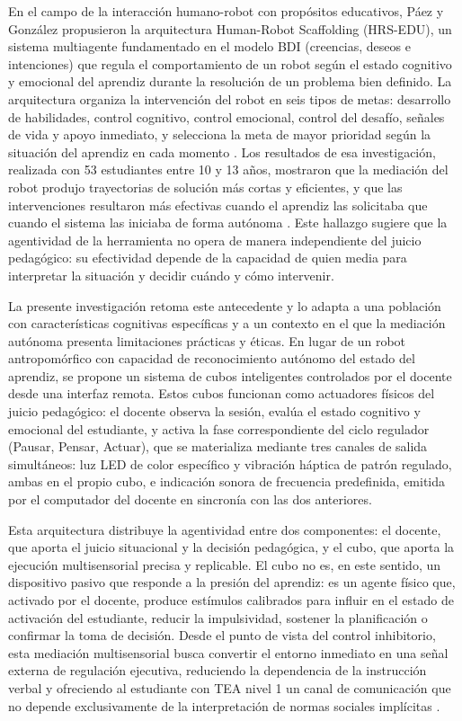 \documentclass{book}
\begin{document}
En el campo de la interacción humano-robot con propósitos 
educativos, Páez y González propusieron la arquitectura 
Human-Robot Scaffolding (HRS-EDU), un sistema multiagente 
fundamentado en el modelo BDI (creencias, deseos e intenciones) 
que regula el comportamiento de un robot según el estado 
cognitivo y emocional del aprendiz durante la resolución de un 
problema bien definido. La arquitectura organiza la intervención 
del robot en seis tipos de metas: desarrollo de habilidades, 
control cognitivo, control emocional, control del desafío, 
señales de vida y apoyo inmediato, y selecciona la meta de mayor 
prioridad según la situación del aprendiz en cada momento 
\cite{PaezGonzalez2022}. Los resultados de esa investigación, 
realizada con 53 estudiantes entre 10 y 13 años, mostraron que 
la mediación del robot produjo trayectorias de solución más 
cortas y eficientes, y que las intervenciones resultaron más 
efectivas cuando el aprendiz las solicitaba que cuando el sistema 
las iniciaba de forma autónoma \cite{PaezGonzalez2022}. Este 
hallazgo sugiere que la agentividad de la herramienta no opera 
de manera independiente del juicio pedagógico: su efectividad 
depende de la capacidad de quien media para interpretar la 
situación y decidir cuándo y cómo intervenir.

La presente investigación retoma este antecedente y lo adapta 
a una población con características cognitivas específicas y a 
un contexto en el que la mediación autónoma presenta limitaciones 
prácticas y éticas. En lugar de un robot antropomórfico con 
capacidad de reconocimiento autónomo del estado del aprendiz, 
se propone un sistema de cubos inteligentes controlados por el 
docente desde una interfaz remota. Estos cubos funcionan como 
actuadores físicos del juicio pedagógico: el docente observa 
la sesión, evalúa el estado cognitivo y emocional del estudiante, 
y activa la fase correspondiente del ciclo regulador 
(Pausar, Pensar, Actuar), que se materializa mediante
tres canales de salida simultáneos: luz LED de color específico y
vibración háptica de patrón regulado, ambas en el propio cubo, e
indicación sonora de frecuencia predefinida, emitida por el
computador del docente en sincronía con las dos anteriores.

Esta arquitectura distribuye la agentividad entre dos componentes: 
el docente, que aporta el juicio situacional y la decisión 
pedagógica, y el cubo, que aporta la ejecución multisensorial 
precisa y replicable. El cubo no es, en este sentido, un 
dispositivo pasivo que responde a la presión del aprendiz: 
es un agente físico que, activado por el docente, produce 
estímulos calibrados para influir en el estado de activación 
del estudiante, reducir la impulsividad, sostener la planificación 
o confirmar la toma de decisión. Desde el punto de vista del 
control inhibitorio, esta mediación multisensorial busca 
convertir el entorno inmediato en una señal externa de regulación 
ejecutiva, reduciendo la dependencia de la instrucción verbal 
y ofreciendo al estudiante con TEA nivel 1 un canal de 
comunicación que no depende exclusivamente de la interpretación 
de normas sociales implícitas \cite{Wood1976, PaezGonzalez2022}.
\end{document}
